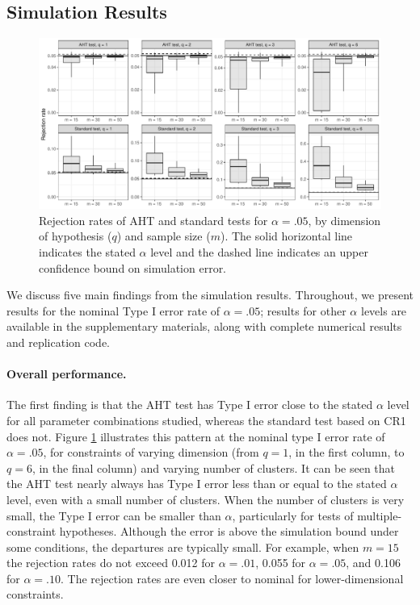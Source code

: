 \documentclass[12pt]{article}
\begin{document}
\hypertarget{simulation-results}{%
\subsection{Simulation Results}\label{simulation-results}}

\begin{figure}

{\centering \includegraphics[width=\linewidth]{CR_fig/overview-1} 

}

\caption{Rejection rates of AHT and standard tests for $\alpha = .05$, by dimension of hypothesis ($q$) and sample size ($m$). The solid horizontal line indicates the stated $\alpha$ level and the dashed line indicates an upper confidence bound on simulation error.}\label{fig:overview}
\end{figure}

We discuss five main findings from the simulation results. Throughout,
we present results for the nominal Type I error rate of
\(\alpha = .05\); results for other \(\alpha\) levels are available in
the supplementary materials, along with complete numerical results and
replication code.

\hypertarget{overall-performance.}{%
\paragraph{Overall performance.}\label{overall-performance.}}

The first finding is that the AHT test has Type I error close to the
stated \(\alpha\) level for all parameter combinations studied, whereas
the standard test based on CR1 does not. Figure \ref{fig:overview}
illustrates this pattern at the nominal type I error rate of
\(\alpha = .05\), for constraints of varying dimension (from \(q = 1\),
in the first column, to \(q = 6\), in the final column) and varying
number of clusters. It can be seen that the AHT test nearly always has
Type I error less than or equal to the stated \(\alpha\) level, even
with a small number of clusters. When the number of clusters is very
small, the Type I error can be smaller than \(\alpha\), particularly for
tests of multiple-constraint hypotheses. Although the error is above the
simulation bound under some conditions, the departures are typically
small. For example, when \(m = 15\) the rejection rates do not exceed
0.012 for \(\alpha = .01\), 0.055 for \(\alpha = .05\), and 0.106 for
\(\alpha = .10\). The rejection rates are even closer to nominal for
lower-dimensional constraints.
\end{document}
